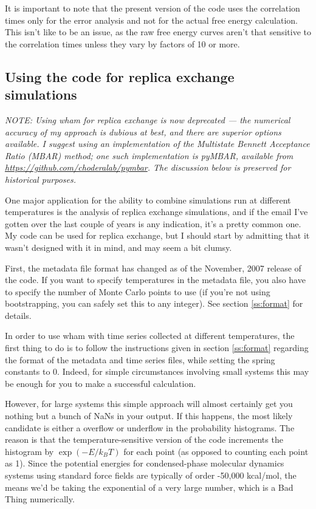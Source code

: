 \documentclass[12pt]{article}
\begin{document}
It is important to note that the present version of the code uses the
correlation times only for the error analysis and not for the actual free energy
calculation.  This isn't like to be an issue, as the raw free energy curves
aren't that sensitive to the correlation times unless they vary by factors of 10
or more.


\subsection{Using the code for replica exchange simulations}
\label{ss:repex}

\emph{ NOTE: Using wham for replica exchange is now deprecated --- the numerical
accuracy of my approach is dubious at best, and there are superior options
available. I suggest using an implementation of the Multistate Bennett
Acceptance Ratio (MBAR) method; one such implementation is pyMBAR, available
from \url{https://github.com/choderalab/pymbar}. The discussion below is
preserved for historical purposes.  }

One major application for the ability to combine simulations run at different
temperatures is the analysis of replica exchange simulations, and if the
email I've gotten over the last couple of years is any indication, it's a
pretty common one.  My code can be used for replica exchange, but I should
start by admitting that it wasn't designed with it in mind, and may seem a
bit clumsy.

First, the metadata file format has changed as of the November, 2007 release
of the code.  If you want to specify temperatures in the metadata file, you
also have to specify the number of Monte Carlo points to use (if you're not
using bootstrapping, you can safely set this to any integer).  See section
\ref{ss:format} for details.

In order to use wham with time series collected at different temperatures,
the first thing to do is to follow the instructions given in section
\ref{ss:format} regarding the format of the metadata and time series files,
while setting the spring constants to 0.  Indeed, for simple circumstances
involving small systems this may be enough for you to make a successful
calculation.

However, for large systems this simple approach will almost certainly get you
nothing but a bunch of NaNs in your output.  If this happens, the most likely
candidate is either a overflow or underflow in the probability histograms.
The reason is that the temperature-sensitive version of the code increments
the histogram by $\exp(-E/k_B T)$ for each point (as opposed to counting each
point as 1).  Since the potential energies for condensed-phase
molecular dynamics systems using standard force fields are typically of order
-50,000 kcal/mol, the means we'd be taking the exponential of a very large
number, which is a Bad Thing numerically.
\end{document}

